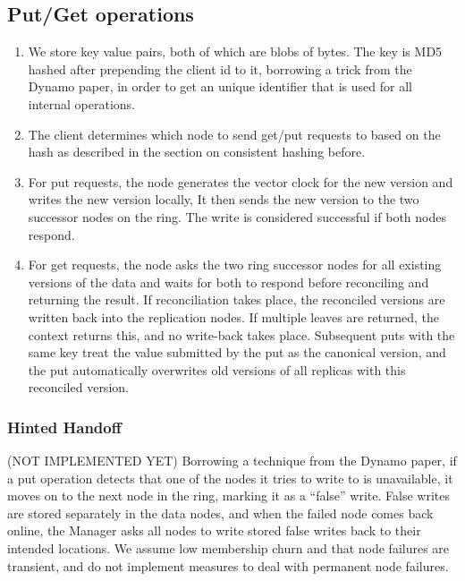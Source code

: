 \documentclass[paper=a4,fontsize=11pt]{report} %
\numberwithin{equation}{section} %
\numberwithin{figure}{section} %
\numberwithin{table}{section} %
\begin{document}
\subsection{Put/Get operations}
\begin{enumerate}
\item We store key value pairs, both of which are blobs of bytes. The key is MD5 hashed after prepending the client id to it, borrowing a trick from the Dynamo paper, in order to get an unique identifier that is used for all internal operations.
\item The client determines which node to send get/put requests to based on the hash as described in the section on consistent hashing before.
\item For put requests, the node generates the vector clock for the new version and writes the new version locally, It then sends the new version to the two successor nodes on the ring. The write is considered successful if both nodes respond.
\item For get requests, the node asks the two ring successor nodes for all existing versions of the data and waits for both to respond before reconciling and returning the result. If reconciliation takes place, the reconciled versions are written back into the replication nodes. If multiple leaves are returned, the context returns this, and no write-back takes place. Subsequent puts with the same key treat the value submitted by the put as the canonical version, and the put automatically overwrites old versions of all replicas with this reconciled version.
\end{enumerate}

\subsubsection{Hinted Handoff} (NOT IMPLEMENTED YET)
Borrowing a technique from the Dynamo paper, if a put operation detects that one of the nodes it tries to write to is unavailable, it moves on to the next node in the ring, marking it as a ``false'' write. False writes are stored separately in the data nodes, and when the failed node comes back online, the Manager asks all nodes to write stored false writes back to their intended locations. We assume low membership churn and that node failures are transient, and do not implement measures to deal with permanent node failures.
\end{document}
